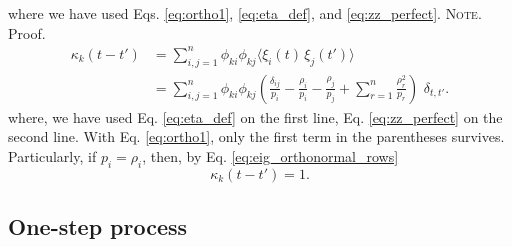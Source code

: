 \documentclass[reprint, floatfix]{revtex4-1}
\newcommand{\note}[1]{{\color{DarkGreen}\footnotesize \textsc{Note.} #1}}
\begin{document}
%
where we have used
Eqs. \eqref{eq:ortho1},
\eqref{eq:eta_def},
and
\eqref{eq:zz_perfect}.
%
\note{Proof.%
  $$
  \begin{aligned}
  \kappa_k(t - t')
  &=
  \sum_{i,j = 1}^n
  \phi_{ki}
  \phi_{kj}
  \langle \xi_i(t) \, \xi_j(t') \rangle
  \\
  &=
  \sum_{i,j = 1}^n
  \phi_{ki}
  \phi_{kj}
  \left(
    \frac{ \delta_{ij} } { p_i }
    -
    \frac{ \rho_i } { p_i }
    -
    \frac{ \rho_j } { p_j }
    +
    \sum_{r = 1}^n
    \frac{ \rho_r^2 } { p_r }
  \right) \,
  \, \delta_{t, t'}
  .
  \end{aligned}
  $$
  where,
  we have used
  Eq. \eqref{eq:eta_def}
  on the first line,
  Eq. \eqref{eq:zz_perfect}
  on the second line.
  With Eq. \eqref{eq:ortho1},
  only the first term in the parentheses survives.
}
Particularly, if $p_i = \rho_i$, then, by
Eq. \eqref{eq:eig_orthonormal_rows}
$$
\kappa_k(t - t') = 1.
$$




\subsection{\label{sec:Gamma_onestep}
One-step process}
\end{document}
